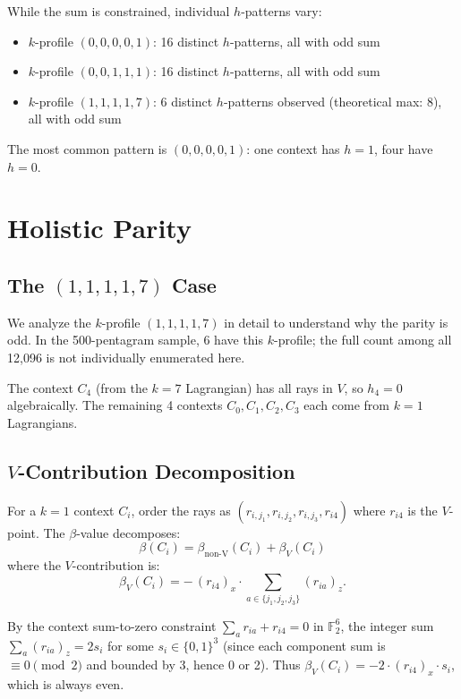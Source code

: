 \documentclass[11pt,a4paper]{article}
\theoremstyle{remark}
\newcommand{\F}{\mathbb{F}}
\begin{document}
While the sum is constrained, individual $h$-patterns vary:
\begin{itemize}
  \item $k$-profile $(0,0,0,0,1)$: 16 distinct $h$-patterns, all with odd sum
  \item $k$-profile $(0,0,1,1,1)$: 16 distinct $h$-patterns, all with odd sum
  \item $k$-profile $(1,1,1,1,7)$: 6 distinct $h$-patterns observed (theoretical max: 8), all with odd sum
\end{itemize}

The most common pattern is $(0,0,0,0,1)$: one context has $h=1$, four have $h=0$.


\section{Holistic Parity}\label{sec:holistic}

\subsection{\texorpdfstring{The $(1,1,1,1,7)$ Case}{The (1,1,1,1,7) Case}}

We analyze the $k$-profile $(1,1,1,1,7)$ in detail to understand why the parity is odd.
In the 500-pentagram sample, 6 have this $k$-profile; the full count among all 12{,}096 is not individually enumerated here.

The context $C_4$ (from the $k=7$ Lagrangian) has all rays in $V$, so $h_4 = 0$ algebraically.
The remaining 4 contexts $C_0, C_1, C_2, C_3$ each come from $k=1$ Lagrangians.

\subsection{\texorpdfstring{$V$-Contribution Decomposition}{V-Contribution Decomposition}}

For a $k=1$ context $C_i$, order the rays as $(r_{i,j_1}, r_{i,j_2}, r_{i,j_3}, r_{i4})$ where $r_{i4}$ is the $V$-point.
The $\beta$-value decomposes:
\[
  \beta(C_i) = \beta_{\mathrm{non\text{-}V}}(C_i) + \beta_V(C_i)
\]
where the $V$-contribution is:
\[
  \beta_V(C_i) = -\,(r_{i4})_x \cdot \sum_{a \in \{j_1,j_2,j_3\}} (r_{ia})_z.
\]

By the context sum-to-zero constraint $\sum_a r_{ia} + r_{i4} = 0$ in $\F_2^6$, the integer sum $\sum_a (r_{ia})_z = 2s_i$ for some $s_i \in \{0,1\}^3$ (since each component sum is $\equiv 0 \pmod{2}$ and bounded by 3, hence 0 or 2).
Thus $\beta_V(C_i) = -2 \cdot (r_{i4})_x \cdot s_i$, which is always even.
\end{document}
